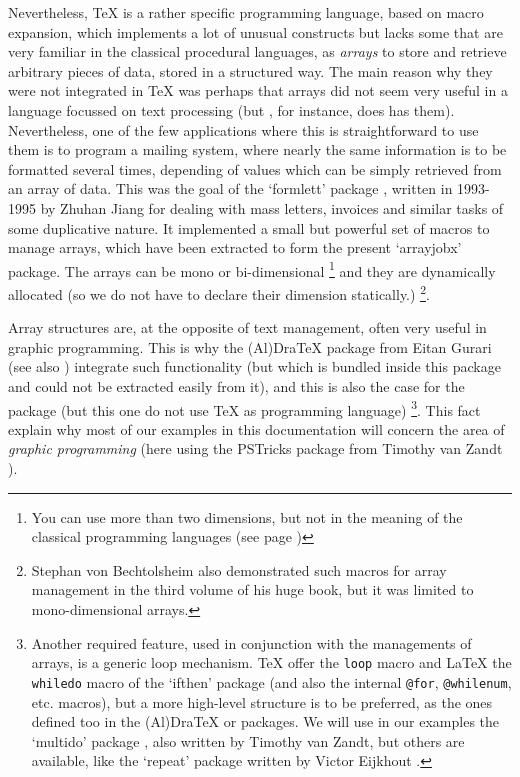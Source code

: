 \documentclass{article}
\newcommand{\AlDraTeXPackage}{\textsf{(Al)Dra\TeX}}
\newcommand{\ArrayJobPackage}{`\textsf{arrayjobx}'}
\newcommand{\FormLettPackage}{`\textsf{formlett}'}
\newcommand{\IfThenPackage}{`\textsf{ifthen}'}
\newcommand{\MetaFontPackage}{\MF}
\newcommand{\MetaPostPackage}{\MP}
\newcommand{\MultiDoPackage}{`\textsf{multido}'}
\newcommand{\PSTricksPackage}{\textsf{PSTricks}}
\newcommand{\RepeatPackage}{`\textsf{repeat}'}
\newcommand{\BS}{\texttt{\symbol{`\\}}}
\newcommand{\Macro}[1]{\texttt{\BS#1}}
\begin{document}
  Nevertheless, \TeX{} is a rather specific programming language, based on
macro expansion, which implements a lot of unusual constructs but lacks some that are very familiar in the classical procedural languages, as
\emph{arrays} to store and retrieve arbitrary pieces of data, stored in a
structured way. The main reason why they were not integrated in \TeX{} was
perhaps that arrays did not seem very useful in a language focussed on text processing (but
\MetaFontPackage{}, for instance, does has them). Nevertheless, one of the few
applications where this is straightforward to use them is to program a mailing
system, where nearly the same information is to be formatted several times,
depending of values which can be simply retrieved from an array of data. This
was the goal of the \FormLettPackage{} package \cite{FORMLETT}, written in
1993-1995 by Zhuhan Jiang for dealing with mass letters, invoices and similar
tasks of some duplicative nature. It implemented a small but powerful set of
macros to manage arrays, which have been extracted to form the present
\ArrayJobPackage{} package. The arrays can be mono or bi-dimensional%
\footnote{You can use more than two dimensions, but not in the meaning of the
classical programming languages (see page \pageref{par:DataHeight})}
and they are dynamically allocated (so we do not have to declare their
dimension statically.)%
\footnote{Stephan von Bechtolsheim \cite[Volume \textsc{III}, paragraph 20.3,
page 136]{SVB93} also demonstrated such macros for array management in the
third volume of his huge book, but it was limited to mono-dimensional
arrays.}.

  Array structures are, at the opposite of text management, often very useful
in graphic programming. This is why the \AlDraTeXPackage{} package from Eitan
Gurari \cite{ALDRATEX} (see also \cite{Gur94}) integrate such functionality
(but which is bundled inside this package and could not be extracted easily
from it), and this is also the case for the \MetaPostPackage{} package
\cite{METAPOST} (but this one do not use \TeX{} as programming language)%
\footnote{Another required feature, used in conjunction with the managements
of arrays, is a generic loop mechanism. \TeX{} offer the \Macro{loop} macro
and \LaTeX{} the \Macro{whiledo} macro of the \IfThenPackage{} package (and
also the internal \Macro{@for}, \Macro{@whilenum}, etc. macros), but a more
high-level structure is to be preferred, as the ones defined too in the
\AlDraTeXPackage{} or \MetaPostPackage{} packages. We will use in our examples
the \MultiDoPackage{} package \cite{MULTIDO}, also written by Timothy van
Zandt, but others are available, like the \RepeatPackage{} package written by
Victor Eijkhout \cite{REPEAT}.}. This fact explain why most of our examples in
this documentation will concern the area of \emph{graphic programming} (here
using the \PSTricksPackage{} package from Timothy van Zandt \cite{PSTRICKS}).
\end{document}
